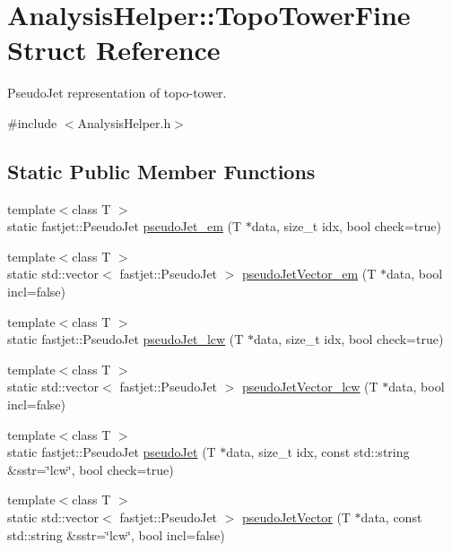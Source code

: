 \hypertarget{structAnalysisHelper_1_1TopoTowerFine}{}\section{Analysis\+Helper\+:\+:Topo\+Tower\+Fine Struct Reference}
\label{structAnalysisHelper_1_1TopoTowerFine}


Pseudo\+Jet representation of topo-\/tower.  




{\ttfamily \#include $<$Analysis\+Helper.\+h$>$}

\subsection*{Static Public Member Functions}
\begin{DoxyCompactItemize}
\item 
{\footnotesize template$<$class T $>$ }\\static fastjet\+::\+Pseudo\+Jet \hyperlink{structAnalysisHelper_1_1TopoTowerFine_ac9d4c942abb9755eabf381a560864e0c}{pseudo\+Jet\+\_\+em} (T $\ast$data, size\+\_\+t idx, bool check=true)
\item 
{\footnotesize template$<$class T $>$ }\\static std\+::vector$<$ fastjet\+::\+Pseudo\+Jet $>$ \hyperlink{structAnalysisHelper_1_1TopoTowerFine_ad764a4d232cdfb94caf4c65fabfcf909}{pseudo\+Jet\+Vector\+\_\+em} (T $\ast$data, bool incl=false)
\item 
{\footnotesize template$<$class T $>$ }\\static fastjet\+::\+Pseudo\+Jet \hyperlink{structAnalysisHelper_1_1TopoTowerFine_a5595a15af3cbf1595249f039dab9a78d}{pseudo\+Jet\+\_\+lcw} (T $\ast$data, size\+\_\+t idx, bool check=true)
\item 
{\footnotesize template$<$class T $>$ }\\static std\+::vector$<$ fastjet\+::\+Pseudo\+Jet $>$ \hyperlink{structAnalysisHelper_1_1TopoTowerFine_a89b189a7a3bd4ae87a9f737a16e13592}{pseudo\+Jet\+Vector\+\_\+lcw} (T $\ast$data, bool incl=false)
\item 
{\footnotesize template$<$class T $>$ }\\static fastjet\+::\+Pseudo\+Jet \hyperlink{structAnalysisHelper_1_1TopoTowerFine_a3e13f367df53b5d1586d3b7d752bf798}{pseudo\+Jet} (T $\ast$data, size\+\_\+t idx, const std\+::string \&sstr=\char`\"{}lcw\char`\"{}, bool check=true)
\item 
{\footnotesize template$<$class T $>$ }\\static std\+::vector$<$ fastjet\+::\+Pseudo\+Jet $>$ \hyperlink{structAnalysisHelper_1_1TopoTowerFine_a172705cc4e344a826fc6f6bb4b10d1dc}{pseudo\+Jet\+Vector} (T $\ast$data, const std\+::string \&sstr=\char`\"{}lcw\char`\"{}, bool incl=false)
\end{DoxyCompactItemize}


